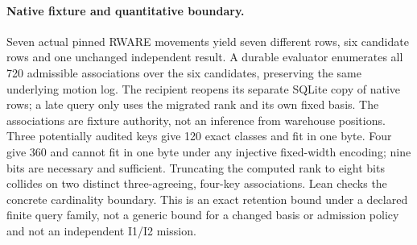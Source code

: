 \documentclass{article}
\begin{document}
\paragraph{Native fixture and quantitative boundary.}
Seven actual pinned RWARE movements yield seven different rows,
six candidate rows and one unchanged independent result.
A durable evaluator enumerates all 720 admissible associations over
the six candidates, preserving the same underlying motion log.
The recipient reopens its separate SQLite copy of native rows; a
late query only uses the migrated rank and its own fixed basis.
The associations are fixture authority, not an inference from
warehouse positions. Three potentially audited keys give 120
exact classes and fit in one byte. Four give 360 and cannot fit
in one byte under any injective fixed-width encoding; nine bits
are necessary and sufficient. Truncating the computed rank to
eight bits collides on two distinct three-agreeing, four-key
associations. Lean checks the concrete cardinality boundary.
This is an exact retention bound under a declared finite query
family, not a generic bound for a changed basis or admission
policy and not an independent I1/I2 mission.
\end{document}
